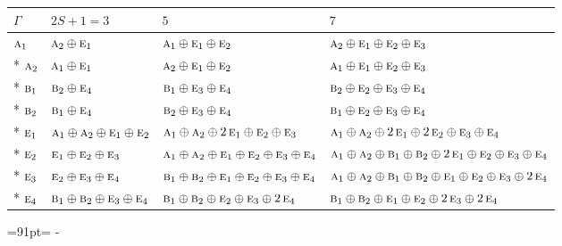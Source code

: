 \documentclass[10pt,a4paper]{article}
\newcommand{\needspace}[1]{\par\penalty-100\begingroup\dimen0=#1\relax\dimen2=\pagegoal
  \advance\dimen2-\pagetotal\ifdim\dimen0>\dimen2\relax\ifdim\dimen2>0pt\vfil\break\fi\fi
  \endgroup}
\numberwithin{equation}{section}
\newcommand{\irr}[1]{\text{\normalfont\scshape #1}}
\begin{document}
{\small\setlength{\tabcolsep}{3pt}\begin{longtable}{@{}llll@{}}\toprule
$\Gamma$ & $2S + 1 = 3$ & $5$ & $7$\\\midrule\endhead
\bottomrule\endfoot\endlastfoot
$\irr{a}_{1}$ & $\irr{a}_{2}\oplus \irr{e}_{1}$ & $\irr{a}_{1}\oplus \irr{e}_{1}\oplus \irr{e}_{2}$ & $\irr{a}_{2}\oplus \irr{e}_{1}\oplus \irr{e}_{2}\oplus \irr{e}_{3}$\\*
$\irr{a}_{2}$ & $\irr{a}_{1}\oplus \irr{e}_{1}$ & $\irr{a}_{2}\oplus \irr{e}_{1}\oplus \irr{e}_{2}$ & $\irr{a}_{1}\oplus \irr{e}_{1}\oplus \irr{e}_{2}\oplus \irr{e}_{3}$\\*
$\irr{b}_{1}$ & $\irr{b}_{2}\oplus \irr{e}_{4}$ & $\irr{b}_{1}\oplus \irr{e}_{3}\oplus \irr{e}_{4}$ & $\irr{b}_{2}\oplus \irr{e}_{2}\oplus \irr{e}_{3}\oplus \irr{e}_{4}$\\*
$\irr{b}_{2}$ & $\irr{b}_{1}\oplus \irr{e}_{4}$ & $\irr{b}_{2}\oplus \irr{e}_{3}\oplus \irr{e}_{4}$ & $\irr{b}_{1}\oplus \irr{e}_{2}\oplus \irr{e}_{3}\oplus \irr{e}_{4}$\\*
$\irr{e}_{1}$ & $\irr{a}_{1}\oplus \irr{a}_{2}\oplus \irr{e}_{1}\oplus \irr{e}_{2}$ & $\irr{a}_{1}\oplus \irr{a}_{2}\oplus 2\,\irr{e}_{1}\oplus \irr{e}_{2}\oplus \irr{e}_{3}$ & $\irr{a}_{1}\oplus \irr{a}_{2}\oplus 2\,\irr{e}_{1}\oplus 2\,\irr{e}_{2}\oplus \irr{e}_{3}\oplus \irr{e}_{4}$\\*
$\irr{e}_{2}$ & $\irr{e}_{1}\oplus \irr{e}_{2}\oplus \irr{e}_{3}$ & $\irr{a}_{1}\oplus \irr{a}_{2}\oplus \irr{e}_{1}\oplus \irr{e}_{2}\oplus \irr{e}_{3}\oplus \irr{e}_{4}$ & $\irr{a}_{1}\oplus \irr{a}_{2}\oplus \irr{b}_{1}\oplus \irr{b}_{2}\oplus 2\,\irr{e}_{1}\oplus \irr{e}_{2}\oplus \irr{e}_{3}\oplus \irr{e}_{4}$\\*
$\irr{e}_{3}$ & $\irr{e}_{2}\oplus \irr{e}_{3}\oplus \irr{e}_{4}$ & $\irr{b}_{1}\oplus \irr{b}_{2}\oplus \irr{e}_{1}\oplus \irr{e}_{2}\oplus \irr{e}_{3}\oplus \irr{e}_{4}$ & $\irr{a}_{1}\oplus \irr{a}_{2}\oplus \irr{b}_{1}\oplus \irr{b}_{2}\oplus \irr{e}_{1}\oplus \irr{e}_{2}\oplus \irr{e}_{3}\oplus 2\,\irr{e}_{4}$\\*
$\irr{e}_{4}$ & $\irr{b}_{1}\oplus \irr{b}_{2}\oplus \irr{e}_{3}\oplus \irr{e}_{4}$ & $\irr{b}_{1}\oplus \irr{b}_{2}\oplus \irr{e}_{2}\oplus \irr{e}_{3}\oplus 2\,\irr{e}_{4}$ & $\irr{b}_{1}\oplus \irr{b}_{2}\oplus \irr{e}_{1}\oplus \irr{e}_{2}\oplus 2\,\irr{e}_{3}\oplus 2\,\irr{e}_{4}$\\
\bottomrule\end{longtable}}
\needspace{91pt}
\end{document}
